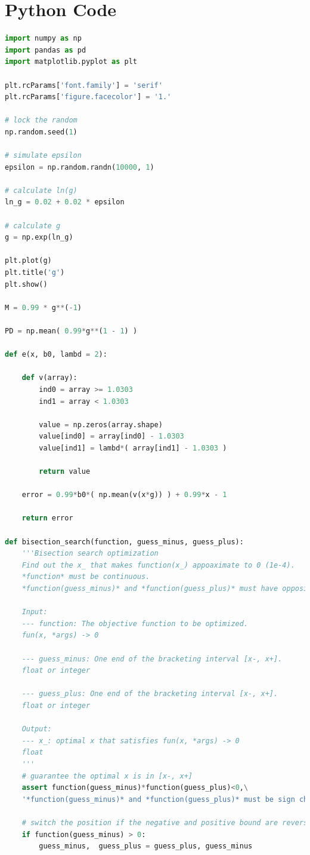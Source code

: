 \documentclass{article}
\begin{document}
\section{Python Code}
\begin{lstlisting}[language=Python, caption=Python Code]
import numpy as np
import pandas as pd
import matplotlib.pyplot as plt

plt.rcParams['font.family'] = 'serif'
plt.rcParams['figure.facecolor'] = '1.'

# lock the random
np.random.seed(1)

# simulate epsilon
epsilon = np.random.randn(10000, 1)

# calculate ln(g)
ln_g = 0.02 + 0.02 * epsilon

# calculate g
g = np.exp(ln_g)

plt.plot(g)
plt.title('g')
plt.show()

M = 0.99 * g**(-1)

PD = np.mean( 0.99*g**(1 - 1) )

def e(x, b0, lambd = 2): 

	def v(array):
		ind0 = array >= 1.0303
		ind1 = array < 1.0303
		
		value = np.zeros(array.shape)
		value[ind0] = array[ind0] - 1.0303
		value[ind1] = lambd*( array[ind1] - 1.0303 )
		
		return value
	
	error = 0.99*b0*( np.mean(v(x*g)) ) + 0.99*x - 1
	
	return error

def bisection_search(function, guess_minus, guess_plus):
	'''Bisection search optimization
	Find out the x_ that makes function(x_) appoaximate to 0 (1e-4).
	*function* must be continuous. 
	*function(guess_minus)* and *function(guess_plus)* must have opposite signs.
	
	Input:
	--- function: The objective function to be optimized.
	fun(x, *args) -> 0
	
	--- guess_minus: One end of the bracketing interval [x-, x+].
	float or integer
	
	--- guess_plus: One end of the bracketing interval [x-, x+].
	float or integer
	
	Output:
	--- x_: optimal x that satisfies fun(x, *args) -> 0
	float
	'''
	# guarantee the optimal x is in [x-, x+]
	assert function(guess_minus)*function(guess_plus)<0,\
	'*function(guess_minus)* and *function(guess_plus)* must be sign changing values'
	
	# switch the position if the negative and positive bound are reversed
	if function(guess_minus) > 0:
		guess_minus,  guess_plus = guess_plus, guess_minus
	

\end{lstlisting}
\end{document}
